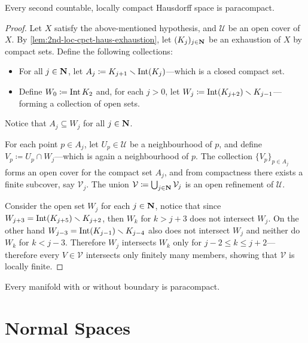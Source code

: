 \begin{theorem}
\label{thm:2nd-ctbl-loc-cpct-haus-is-paracompact}
Every second countable, locally compact Hausdorff space is paracompact.
\end{theorem}

\begin{proof}
Let \(X\) satisfy the above-mentioned hypothesis, and \(\mathcal{U}\) be an open
cover of \(X\). By \cref{lem:2nd-loc-cpct-haus-exhaustion}, let
\((K_j)_{j \in \mathbf{N}}\) be an exhaustion of \(X\) by compact sets. Define the
following collections:
\begin{itemize}\setlength\itemsep{0em}
\item For all \(j \in \mathbf{N}\), let
  \(A_j \coloneq K_{j+1} \smallsetminus \operatorname{Int}(K_j)\)---which is a closed compact set.
\item Define \(W_0 \coloneq \operatorname{Int} K_2\) and, for each \(j > 0\), let
  \(W_j \coloneq \operatorname{Int}(K_{j+2}) \smallsetminus K_{j-1}\)---forming a collection of
  open sets.
\end{itemize}
Notice that \(A_j \subseteq W_j\) for all \(j \in \mathbf{N}\).

For each point \(p \in A_j\), let \(U_p \in \mathcal{U}\) be a neighbourhood of
\(p\), and define \(V_p \coloneq U_p \cap W_j\)---which is again a
neighbourhood of \(p\). The collection \(\{V_p\}_{p \in A_j}\) forms an open
cover for the compact set \(A_j\), and from compactness there exists a finite
subcover, say \(\mathcal{V}_j\). The union
\(\mathcal{V} \coloneq \bigcup_{j \in \mathbf{N}} \mathcal{V}_j\) is an open refinement
of \(\mathcal{U}\).


Consider the open set \(W_j\) for each \(j \in \mathbf{N}\), notice that since
\(W_{j+3} = \operatorname{Int}(K_{j+5}) \smallsetminus K_{j+2}\), then \(W_k\) for \(k > j+3\) does not
intersect \(W_j\). On the other hand
\(W_{j-3} = \operatorname{Int}(K_{j - 1}) \smallsetminus K_{j-4}\) also does not intersect \(W_j\) and
neither do \(W_k\) for \(k < j - 3\). Therefore \(W_j\) intersects \(W_k\) only
for \(j - 2 \leq k \leq j + 2\)---therefore every \(V \in \mathcal{V}\) intersects only finitely
many members, showing that \(\mathcal{V}\) is locally finite.
\end{proof}

\begin{corollary}
\label{cor:manifold-paracompact}
Every manifold with or without boundary is paracompact.
\end{corollary}

\section{Normal Spaces}

